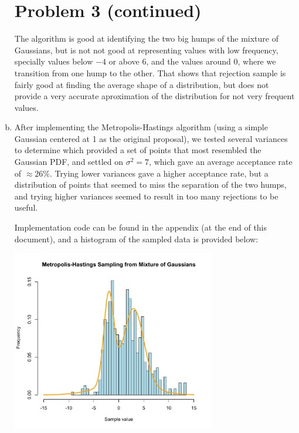 \documentclass{article}
\begin{document}
\begin{enumerate}[(a)]
    \section*{Problem 3 (continued)}
            The algorithm is good at identifying the two big humps of the mixture of Gaussians, but is not not good at representing values with low frequency, specially values below $-4$ or above $6$, and the values around $0$, where we transition from one hump to the other. That shows that rejection sample is fairly good at finding the average shape of a distribution, but does not provide a very accurate aproximation of the distribution for not very frequent values.
            \item
                After implementing the Metropolis-Hastings algorithm (using a simple Gaussian centered at 1 as the original proposal), we tested several variances to determine which provided a set of points that most resembled the Gaussian PDF, and settled on $\sigma^2 = 7$, which gave an average acceptance rate of $\approx 26\%$. Trying lower variances gave a higher acceptance rate, but a distribution of points that seemed to miss the separation of the two humps, and trying higher variances seemed to result in too many rejections to be useful.

                Implementation code can be found in the appendix (at the end of this document), and a histogram of the sampled data is provided below:
                
                \begin{center}
                    \includegraphics[width=0.7\textwidth]{graph3d}
                \end{center}
        \end{enumerate}    
\end{document}
